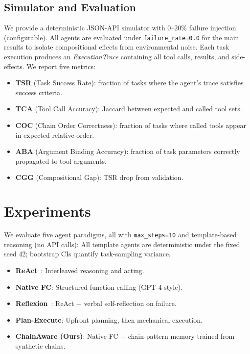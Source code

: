 ﻿\documentclass{article}
\begin{document}
\subsection{Simulator and Evaluation}

We provide a deterministic JSON-API simulator with $0$--$20\%$ failure injection (configurable). All agents are evaluated under \texttt{failure\_rate=0.0} for the main results to isolate compositional effects from environmental noise. Each task execution produces an \emph{ExecutionTrace} containing all tool calls, results, and side-effects. We report five metrics:

\begin{itemize}
    \item \textbf{TSR} (Task Success Rate): fraction of tasks where the agent's trace satisfies success criteria.
    \item \textbf{TCA} (Tool Call Accuracy): Jaccard between expected and called tool sets.
    \item \textbf{COC} (Chain Order Correctness): fraction of tasks where called tools appear in expected relative order.
    \item \textbf{ABA} (Argument Binding Accuracy): fraction of task parameters correctly propagated to tool arguments.
    \item \textbf{CGG} (Compositional Gap): TSR drop from validation.
\end{itemize}

\section{Experiments}
\label{sec:experiments}

We evaluate five agent paradigms, all with \texttt{max\_steps=10} and template-based reasoning (no API calls): All template agents are deterministic under the fixed seed 42; bootstrap CIs quantify task-sampling variance.

\begin{itemize}
    \item \textbf{ReAct}~\citep{yao2023react}: Interleaved reasoning and acting.
    \item \textbf{Native FC}: Structured function calling (GPT-4 style).
    \item \textbf{Reflexion}~\citep{shinn2023reflexion}: ReAct + verbal self-reflection on failure.
    \item \textbf{Plan-Execute}: Upfront planning, then mechanical execution.
    \item \textbf{ChainAware (Ours)}: Native FC + chain-pattern memory trained from synthetic chains.
\end{itemize}
\end{document}
